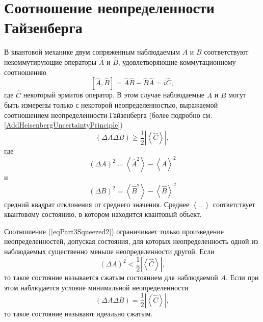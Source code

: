\section{Соотношение неопределенности Гайзенберга}
В квантовой механике двум сопряженным наблюдаемым $A$ и $B$
соответствуют некоммутирующие операторы $\hat{A}$ и $\hat{B}$,
удовлетворяющие коммутационному соотношению
\begin{equation}
\left[
\hat{A}, \hat{B}
\right] = 
\hat{A}\hat{B} - \hat{B}\hat{A} = i \hat{C},
\nonumber
\end{equation}
где $\hat{C}$ некоторый эрмитов оператор. В этом случае наблюдаемые
$A$ и $B$ могут быть измерены только с некоторой неопределенностью,
выражаемой соотношением неопределенности Гайзенберга
(более подробно см. \ref{AddHeisenbergUncertaintyPrinciple})
\begin{equation}
\left(
\Delta A \Delta B
\right) \ge \frac{1}{2} \left|\left<\hat{C}\right>\right|,
\label{eqPart3Squeezed2}
\end{equation}
где
\[
\left(\Delta A\right)^2 = \left<\hat{A}^2\right> - \left<\hat{A}\right>^2
\]
и
\[
\left(\Delta B\right)^2 = \left<\hat{B}^2\right> - \left<\hat{B}\right>^2
\]
средний квадрат отклонения от среднего значения. 
Среднее $\left<\dots\right>$ соответствует квантовому состоянию, в
котором находится квантовый объект.

Соотношение (\ref{eqPart3Squeezed2}) ограничивает только произведение
неопределенностей, допуская состояния, для которых неопределенность
одной из наблюдаемых существенно меньше неопределенности другой.
Если 
\begin{equation}
\left(\Delta A\right)^2 < \frac{1}{2} \left|\left<\hat{C}\right>\right|,
\nonumber
\end{equation}
то такое состояние называется сжатым состоянием для наблюдаемой
$A$. Если при этом наблюдается условие минимальной неопределенности
\begin{equation}
\left(
\Delta A \Delta B
\right) = \frac{1}{2} \left|\left<\hat{C}\right>\right|,
\nonumber
\end{equation}
то такое состояние называют идеально сжатым.
